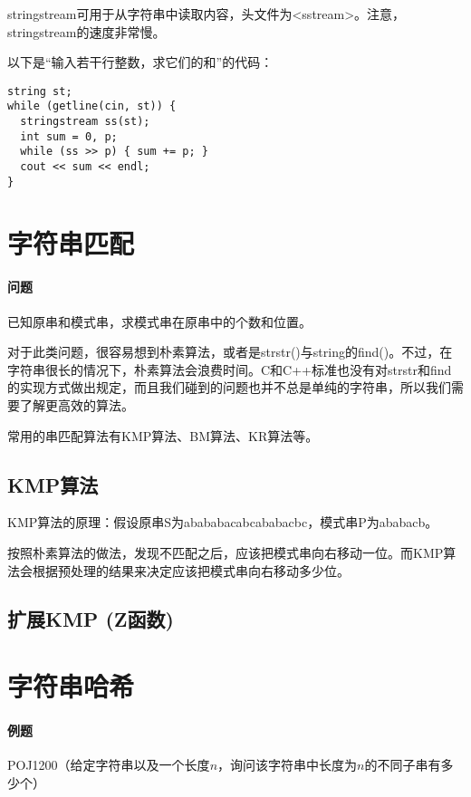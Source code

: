 stringstream可用于从字符串中读取内容，头文件为<sstream>。注意，stringstream的速度非常慢。

以下是“输入若干行整数，求它们的和”的代码：

\begin{lstlisting}
string st;
while (getline(cin, st)) {
  stringstream ss(st);
  int sum = 0, p;
  while (ss >> p) { sum += p; }
  cout << sum << endl;
}
\end{lstlisting}

\section{字符串匹配}

\paragraph{问题} 已知原串和模式串，求模式串在原串中的个数和位置。

对于此类问题，很容易想到朴素算法，或者是strstr()与string的find()。不过，在字符串很长的情况下，朴素算法会浪费时间。C和C++标准也没有对strstr和find的实现方式做出规定，而且我们碰到的问题也并不总是单纯的字符串，所以我们需要了解更高效的算法。

常用的串匹配算法有KMP算法、BM算法、KR算法等。

\subsection{KMP算法}

KMP算法的原理：假设原串S为abababacabcababacbc，模式串P为ababacb。

按照朴素算法的做法，发现不匹配之后，应该把模式串向右移动一位。而KMP算法会根据预处理的结果来决定应该把模式串向右移动多少位。



\subsection{扩展KMP (Z函数)}


\section{字符串哈希}

\paragraph{例题} POJ1200（给定字符串以及一个长度$n$，询问该字符串中长度为$n$的不同子串有多少个）

